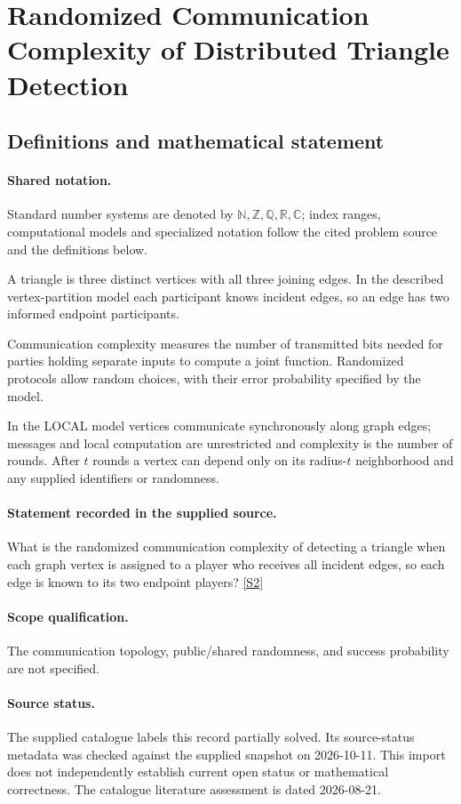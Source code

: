 \documentclass[11pt]{article}
\newcommand{\sref}[2]{\hyperlink{source:#1:#2}{[S#2]}}
\begin{document}
\section{Randomized Communication Complexity of Distributed Triangle Detection}\label{statement}

\subsection{Definitions and mathematical statement}

\paragraph{Shared notation.}Standard number systems are denoted by $\mathbb N,\mathbb Z,\mathbb Q,\mathbb R,\mathbb C$; index ranges, computational models and specialized notation follow the cited problem source and the definitions below.


A triangle is three distinct vertices with all three joining edges. In the described vertex-partition model each participant knows incident edges, so an edge has two informed endpoint participants.

Communication complexity measures the number of transmitted bits needed for parties holding separate inputs to compute a joint function. Randomized protocols allow random choices, with their error probability specified by the model.

In the LOCAL model vertices communicate synchronously along graph edges; messages and local computation are unrestricted and complexity is the number of rounds. After $t$ rounds a vertex can depend only on its radius-$t$ neighborhood and any supplied identifiers or randomness.
\paragraph{Statement recorded in the supplied source.}
What is the randomized communication complexity of detecting a triangle when each graph vertex is assigned to a player who receives all incident edges, so each edge is known to its two endpoint players? \sref{statement}{2}
\paragraph{Scope qualification.}
The communication topology, public/shared randomness, and success probability are not specified.
\paragraph{Source status.}
The supplied catalogue labels this record partially solved. Its source-status metadata was checked against the supplied snapshot on 2026-10-11. This import does not independently establish current open status or mathematical correctness. The catalogue literature assessment is dated 2026-08-21.
\end{document}
